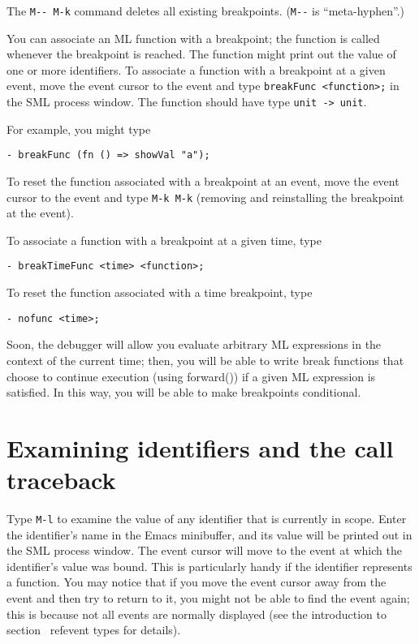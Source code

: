 The \verb'M-- M-k' command deletes all existing breakpoints.
(\verb'M--' is ``meta-hyphen''.)

You can associate an ML function with a breakpoint; the function is
called whenever the breakpoint is reached.  The function might print
out the value of one or more identifiers.  To associate a function with
a breakpoint at a given event, move the event cursor to the event and
type \verb'breakFunc <function>;' in the SML process window.  The
function should have type \verb'unit -> unit'.

For example, you might type

\begin{verbatim}
- breakFunc (fn () => showVal "a");
\end{verbatim}

To reset the function associated with a breakpoint at an event, move
the event cursor to the event and type \verb'M-k M-k' (removing and
reinstalling the breakpoint at the event).

To associate a function with a breakpoint at a given time, type

\begin{verbatim}
- breakTimeFunc <time> <function>;
\end{verbatim}
To reset the function associated with a time breakpoint, type
\begin{verbatim}
- nofunc <time>;
\end{verbatim}

Soon, the debugger will allow you evaluate arbitrary ML expressions in the
context of the current time;  then, you will be able to write 
break functions that choose
to continue execution (using forward()) if a given ML expression is
satisfied.  In this way, you will be able to make breakpoints conditional.

\section{Examining identifiers and the call traceback}
Type \verb'M-l' to examine the value of any identifier that is currently
in scope.  Enter the identifier's name in the Emacs minibuffer, and its
value will be printed out in the SML process window.  The event cursor will
move to the event at which the identifier's value was bound.  This is 
particularly handy if the identifier represents a function.  You may notice
that if you
move the event cursor away from the event and then try to return to it, 
you might not be able to find the event again;
this is because not all events are normally
displayed (see the introduction to section ~ref{event types} for details).

